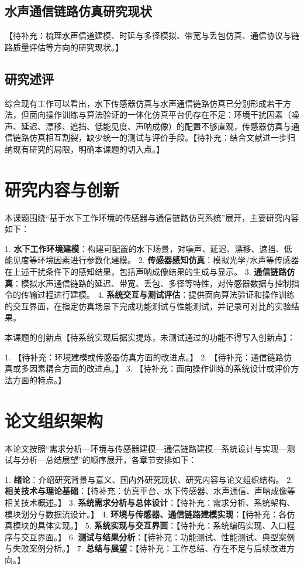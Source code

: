 \subsection{水声通信链路仿真研究现状}

【待补充：梳理水声信道建模、时延与多径模拟、带宽与丢包仿真、通信协议与链路质量评估等方向的研究现状\cite{ref2}。】

\subsection{研究述评}

综合现有工作可以看出，水下传感器仿真与水声通信链路仿真已分别形成若干方法，但面向操作训练与算法验证的一体化仿真平台仍存在不足：环境干扰因素（噪声、延迟、漂移、遮挡、低能见度、声呐成像）的配置不够直观，传感器仿真与通信链路仿真相互割裂，缺少统一的测试与评价手段。【待补充：结合文献进一步归纳现有研究的局限，明确本课题的切入点。】

\section{研究内容与创新}

本课题围绕“基于水下工作环境的传感器与通信链路仿真系统”展开，主要研究内容如下：

1. \textbf{水下工作环境建模}：构建可配置的水下场景，对噪声、延迟、漂移、遮挡、低能见度等环境因素进行参数化建模。
2. \textbf{传感器感知仿真}：模拟光学/水声等传感器在上述干扰条件下的感知结果，包括声呐成像结果的生成与显示。
3. \textbf{通信链路仿真}：模拟水声通信链路的延迟、带宽、丢包、多径等特性，对传感器数据与控制指令的传输过程进行建模。
4. \textbf{系统交互与测试评估}：提供面向算法验证和操作训练的交互界面，在指定仿真场景下完成功能测试与性能测试，并记录可对比的实验结果。

本课题的创新点【待系统实现后据实提炼，未测试通过的功能不得写入创新点】：

1. 【待补充：环境建模或传感器仿真方面的改进点。】
2. 【待补充：通信链路仿真或多因素耦合方面的改进点。】
3. 【待补充：面向操作训练的系统设计或评价方法方面的特点。】

\section{论文组织架构}

本论文按照“需求分析—环境与传感器建模—通信链路建模—系统设计与实现—测试与分析—总结展望”的顺序展开，各章节安排如下：

1. \textbf{绪论}：介绍研究背景与意义、国内外研究现状、研究内容与论文组织结构。
2. \textbf{相关技术与理论基础}：【待补充：仿真平台、水下传感器、水声通信、声呐成像等相关技术概述。】
3. \textbf{系统需求分析与总体设计}：【待补充：需求分析、系统架构、模块划分与数据流设计。】
4. \textbf{环境与传感器、通信链路建模实现}：【待补充：各仿真模块的具体实现。】
5. \textbf{系统实现与交互界面}：【待补充：系统编码实现、入口程序与交互界面。】
6. \textbf{测试与结果分析}：【待补充：功能测试、性能测试、典型案例与失败案例分析。】
7. \textbf{总结与展望}：【待补充：工作总结、存在不足与后续改进方向。】
